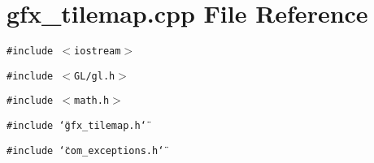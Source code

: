 \section{gfx\_\-tilemap.cpp File Reference}
\label{gfx__tilemap_8cpp}
{\tt \#include $<$iostream$>$}\par
{\tt \#include $<$GL/gl.h$>$}\par
{\tt \#include $<$math.h$>$}\par
{\tt \#include \char`\"{}gfx\_\-tilemap.h\char`\"{}}\par
{\tt \#include \char`\"{}com\_\-exceptions.h\char`\"{}}\par
